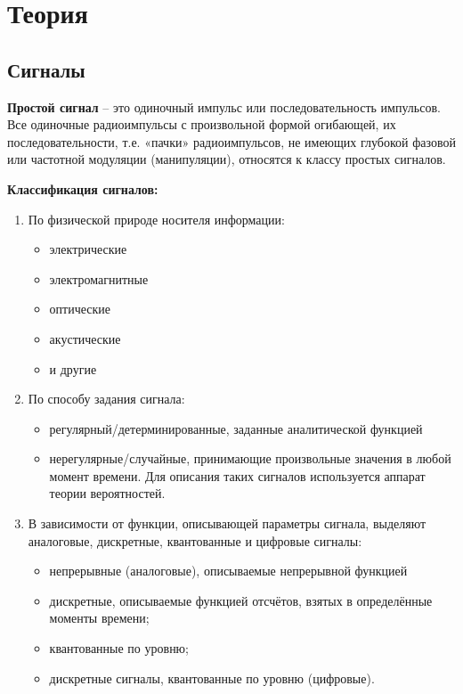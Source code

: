 \documentclass[a4paper,14pt]{extarticle}
\begin{document}
\section{Теория}

\subsection{Сигналы}

\textbf{Простой сигнал} -- это одиночный импульс или последовательность импульсов.\\

Все одиночные радиоимпульсы с произвольной формой огибающей, их последовательности, т.е. «пачки» радиоимпульсов, не имеющих глубокой фазовой или частотной модуляции (манипуляции), относятся к классу простых сигналов.

\textbf{Классификация сигналов:}
\begin{enumerate}
\item По физической природе носителя информации:
	\begin{itemize}
	\item электрические
	\item электромагнитные
	\item оптические
	\item акустические
	\item и другие
	\end{itemize}
\item По способу задания сигнала:
	\begin{itemize}
	\item регулярный/детерминированные, заданные аналитической функцией
	\item нерегулярные/случайные, принимающие произвольные значения в любой момент времени. Для описания таких сигналов используется аппарат теории вероятностей.
	\end{itemize}
\item В зависимости от функции, описывающей параметры сигнала, выделяют аналоговые, дискретные, квантованные и цифровые сигналы:
	\begin{itemize}
\item непрерывные (аналоговые), описываемые непрерывной функцией
\item дискретные, описываемые функцией отсчётов, взятых в определённые моменты времени;
\item квантованные по уровню;
\item дискретные сигналы, квантованные по уровню (цифровые).
	\end{itemize}
	\end{enumerate}
\end{document}
